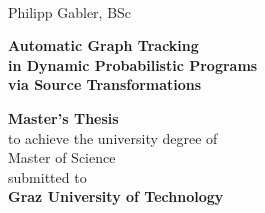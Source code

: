 

\begin{titlingpage}


%

\begin{center}
~
\vfill\vfill\vfill

\sffamily

Philipp Gabler, BSc

\vfill

\begin{Spacing}{1.1}
\LARGE\bfseries Automatic Graph Tracking \\ in Dynamic Probabilistic Programs \\ via Source
Transformations
\end{Spacing}


\vfill\vfill\vfill\vfill

{\normalsize\bfseries Master's Thesis}\\
\vfill
to achieve the university degree of\\
{Master of Science}\\
\vfill
submitted to\\
{\normalsize\bfseries Graz University of Technology}


\end{center}
\end{titlingpage}
